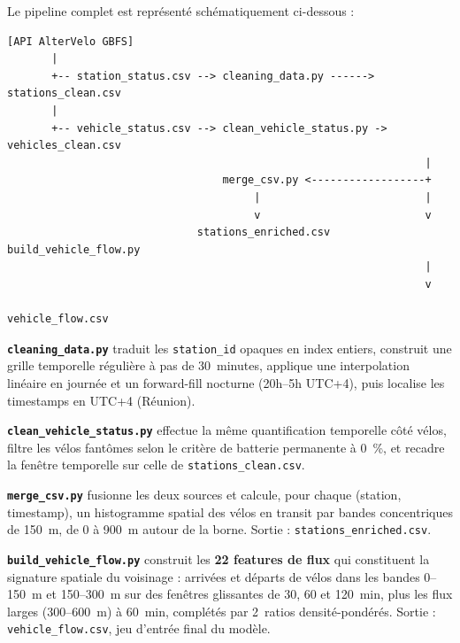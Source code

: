 \documentclass[fleqn, 12pt]{scrartcl}
\begin{document}
\vspace{0.3cm}

Le pipeline complet est représenté schématiquement ci-dessous :

\begin{verbatim}
[API AlterVelo GBFS]
       |
       +-- station_status.csv --> cleaning_data.py ------> stations_clean.csv
       |
       +-- vehicle_status.csv --> clean_vehicle_status.py -> vehicles_clean.csv
                                                                  |
                                  merge_csv.py <------------------+
                                       |                          |
                                       v                          v
                              stations_enriched.csv     build_vehicle_flow.py
                                                                  |
                                                                  v
                                                          vehicle_flow.csv
\end{verbatim}

\textbf{\texttt{cleaning\_data.py}} traduit les \texttt{station\_id} opaques en index entiers, construit une grille temporelle régulière à pas de 30~minutes, applique une interpolation linéaire en journée et un forward-fill nocturne (20h--5h UTC+4), puis localise les timestamps en UTC+4 (Réunion).

\vspace{0.3cm}

\textbf{\texttt{clean\_vehicle\_status.py}} effectue la même quantification temporelle côté vélos, filtre les vélos fantômes selon le critère de batterie permanente à 0~\%, et recadre la fenêtre temporelle sur celle de \texttt{stations\_clean.csv}.

\vspace{0.3cm}

\textbf{\texttt{merge\_csv.py}} fusionne les deux sources et calcule, pour chaque (station, timestamp), un histogramme spatial des vélos en transit par bandes concentriques de 150~m, de 0 à 900~m autour de la borne. Sortie : \texttt{stations\_enriched.csv}.

\vspace{0.3cm}

\textbf{\texttt{build\_vehicle\_flow.py}} construit les \textbf{22 features de flux} qui constituent la signature spatiale du voisinage : arrivées et départs de vélos dans les bandes 0--150~m et 150--300~m sur des fenêtres glissantes de 30, 60 et 120~min, plus les flux larges (300--600~m) à 60~min, complétés par 2~ratios densité-pondérés. Sortie : \texttt{vehicle\_flow.csv}, jeu d'entrée final du modèle.
\end{document}
